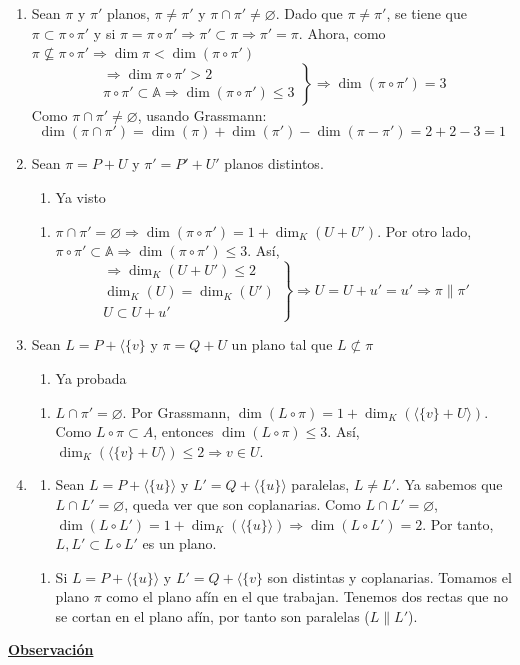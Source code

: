 \documentclass[12pt, a4paper, ones, notitlepage, openany,titlepage]{article}
\newcommand{\dobleimplicacion}[2]{
	\begin{enumerate}[label=$\Rightarrow/$]
		\item #1
	\end{enumerate}
	\begin{enumerate}[label=$\Leftarrow/$]
		\item #2
	\end{enumerate}
}
\newcommand{\observacion}{\noindent\underline{\textbf{Observación}}}
\begin{document}
\begin{enumerate}[label=(\alph*)]
	\item Sean $\pi$ y $\pi'$ planos, $\pi \neq \pi'$ y $\pi \cap \pi' \neq \varnothing$. Dado que $\pi \neq \pi'$, se tiene que $\pi \subset \pi \circ \pi'$ y si $\pi = \pi \circ \pi' \Longrightarrow \pi' \subset \pi \Longrightarrow \pi' = \pi$. Ahora, como $\pi \not\subseteq \pi \circ \pi' \Longrightarrow \dim \pi < \dim(\pi \circ \pi')$
	$$
	\left. \begin{array}{r}
		\Longrightarrow \dim \pi \circ \pi' > 2 \\
		\pi \circ \pi' \subset \mathbb{A} \Longrightarrow \dim(\pi \circ \pi') \le 3
	\end{array} \right\} \Longrightarrow \dim(\pi \circ \pi') = 3
	$$
	Como $\pi \cap \pi' \neq \varnothing$, usando Grassmann:
	$$
	\dim(\pi \cap \pi') = \dim(\pi) + \dim(\pi') - \dim(\pi - \pi') = 2 + 2 - 3 = 1
	$$
	
	\item Sean $\pi = P + U$ y $\pi' = P' + U'$ planos distintos.
	\dobleimplicacion{Ya visto}{
	$\pi \cap \pi' = \varnothing \Longrightarrow \dim(\pi \circ \pi') = 1 + \dim_K (U + U')$. Por otro lado, $\pi \circ \pi' \subset \mathbb{A} \Longrightarrow \dim(\pi \circ \pi') \le 3$. Así,
	$$
	\left. \begin{array}{r}
		\Longrightarrow \dim_K (U + U') \le 2 \\
		\dim_K (U) = \dim_K (U') \\
		U \subset U + u'
	\end{array} \right\} \Longrightarrow U = U + u' = u' \Longrightarrow \pi \| \pi'
	$$}
	
	\item Sean $L = P + \langle\{v\}$ y $\pi = Q + U$ un plano tal que $L \not\subset \pi$
	\dobleimplicacion{Ya probada}{
	$L \cap \pi' = \varnothing$. Por Grassmann, $\dim (L \circ \pi) = 1 + \dim_K (\langle\{v\} + U \rangle)$. Como $L \circ \pi \subset A$, entonces $\dim (L \circ \pi) \le 3$. Así, $\dim_K (\langle\{v\} + U \rangle) \le 2 \Longrightarrow v \in U$.
	}
	
	\item
	\dobleimplicacion
	{Sean $L = P + \langle\{u\}\rangle$ y $L' = Q + \langle\{u\}\rangle$ paralelas, $L \neq L'$. Ya sabemos que $L \cap L' = \varnothing$, queda ver que son coplanarias. Como $L \cap L' = \varnothing$, $\dim (L \circ L') = 1 + \dim_K (\langle \{u\} \rangle) \Longrightarrow \dim (L \circ L') = 2$. Por tanto, $L, L' \subset L \circ L'$ es un plano.}
	{Si $L = P + \langle\{u\}\rangle$ y $L' = Q + \langle\{v\}$ son distintas y coplanarias. Tomamos el plano $\pi$ como el plano afín en el que trabajan. Tenemos dos rectas que no se cortan en el plano afín, por tanto son paralelas ($L\|L'$).}
\end{enumerate}
\observacion
\end{document}
